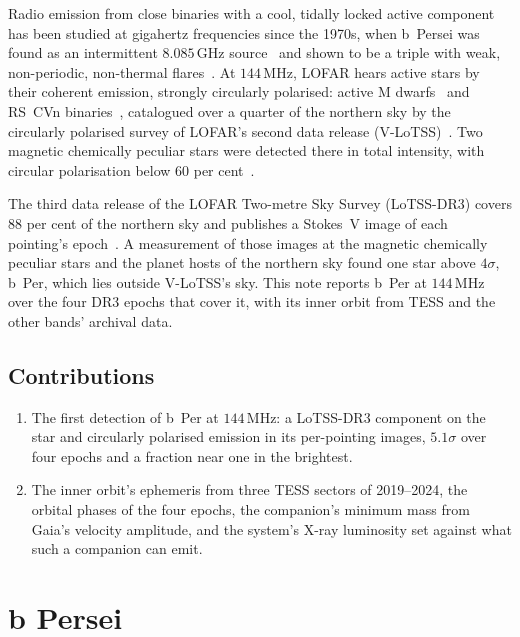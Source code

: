 \documentclass[3p,11pt]{elsarticle}
\begin{document}
Radio emission from close binaries with a cool, tidally locked active component has been
studied at gigahertz frequencies since the 1970s, when b~Persei was found as an
intermittent $8.085$\,GHz source~\cite{HjellmingWade1973} and shown to be a triple with
weak, non-periodic, non-thermal flares~\cite{Hill1976}. At $144$\,MHz, LOFAR hears active
stars by their coherent emission, strongly circularly polarised: active M
dwarfs~\cite{Callingham2021} and RS~CVn binaries~\cite{Toet2021}, catalogued over a
quarter of the northern sky by the circularly polarised survey of LOFAR's second data
release (V-LoTSS)~\cite{Callingham2023}. Two magnetic chemically peculiar stars were
detected there in total intensity, with circular polarisation below $60$ per
cent~\cite{Hajduk2022}.

The third data release of the LOFAR Two-metre Sky Survey (LoTSS-DR3) covers $88$ per
cent of the northern sky and publishes a Stokes~V image of each pointing's
epoch~\cite{Shimwell2026}. A measurement of those images at the magnetic chemically
peculiar stars and the planet hosts of the northern sky found one star above $4\sigma$,
b~Per, which lies outside V-LoTSS's sky. This note reports b~Per at $144$\,MHz over the
four DR3 epochs that cover it, with its inner orbit from TESS and the other bands'
archival data.

\subsection{Contributions}
\begin{enumerate}[leftmargin=*,itemsep=1pt]
\item The first detection of b~Per at $144$\,MHz: a LoTSS-DR3 component on the star and
circularly polarised emission in its per-pointing images, $5.1\sigma$ over four epochs
and a fraction near one in the brightest.
\item The inner orbit's ephemeris from three TESS sectors of 2019--2024, the orbital phases
of the four epochs, the companion's minimum mass from Gaia's velocity amplitude, and the
system's X-ray luminosity set against what such a companion can emit.
\end{enumerate}

\section{b Persei}\label{sec:star}
\end{document}
